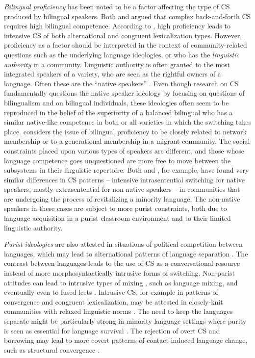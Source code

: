 \documentclass[output=paper]{langscibook}
\begin{document}
\textit{Bilingual proficiency} has been noted to be a factor affecting the type of CS produced by bilingual speakers. Both \textcite{poplack1980sometimes} and \textcite{nortier1990dutch} argued that complex back-and-forth CS requires high bilingual competence. According to \textcite{muysken2000}, high proficiency leads to intensive CS of both alternational and congruent lexicalization types. However, proficiency as a factor should be interpreted in the context of community-related questions such as the underlying language ideologies, or who has the \textit{linguistic authority} in a community. Linguistic authority is often granted to the most integrated speakers of a variety, who are seen as the rightful owners of a language. Often these are the ``native speakers'' \parencite{doerr2009native}.  Even though research on CS fundamentally questions the native speaker ideology by focusing on questions of bilingualism and on bilingual individuals, these ideologies often seem to be reproduced in the belief of the superiority of a balanced bilingual who has a similar native-like competence in both or all varieties in which the switching takes place. \textcite[227]{muysken2000} considers the issue of bilingual proficiency to be closely related to network membership or to a generational membership in a migrant community. The social constraints placed upon various types of speakers are different, and those whose language competence goes unquestioned are more free to move between the subsystems in their linguistic repertoire.  Both \textcite{smith2016regression} and \textcite{lantto2018new}, for example, have found very similar differences in CS patterns – intensive intrasentential switching for native speakers, mostly extrasentential for non-native speakers – in communities that are undergoing the process of revitalizing a minority language. The non-native speakers in these cases are subject to more purist constraints, both due to language acquisition in a purist classroom environment and to their limited linguistic authority. 

\textit{Purist ideologies} are also attested in situations of political competition between languages, which may lead to alternational patterns of language separation \parencite{muysken2013language}. The contrast between languages leads to the use of CS as a conversational resource \parencite{poplack1988contrasting,auer1999codeswitching} instead of more morphosyntactically intrusive forms of switching. Non-purist attitudes can lead to intrusive types of mixing \parencite{poplack1988contrasting}, such as language mixing, and eventually even to fused lects \parencite{auer1999codeswitching}. Intrusive CS, for example in patterns of convergence and congruent lexicalization, may be attested in closely-knit communities with relaxed linguistic norms \parencite{muysken2013language}. The need to keep the languages separate might be particularly strong in minority language settings where purity is seen as essential for language survival \parencite{woolard1998introduction,jaffe2007discourses}. The rejection of overt CS and borrowing may lead to more covert patterns of contact-induced language change, such as structural convergence \parencite[267]{aikhenvald2002language}.
\end{document}
